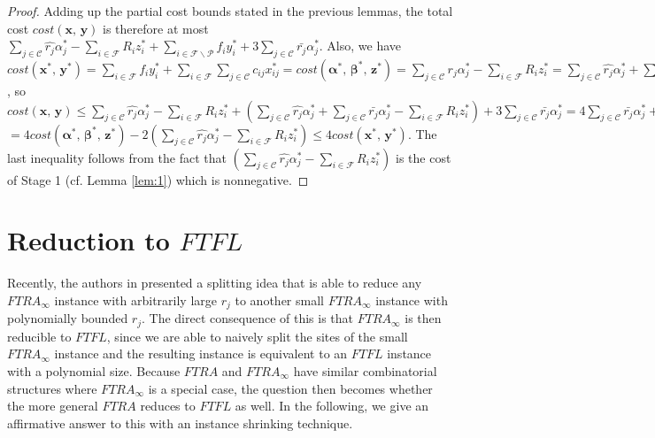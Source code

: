 \documentclass[10pt]{llncs}
\begin{document}
\begin{proof}
Adding up the partial cost bounds stated in the previous lemmas, the
total cost $cost\left(\boldsymbol{x},\,\boldsymbol{y}\right)$ is
therefore at most $\sum_{j\in\mathcal{C}}\hat{r_{j}}\alpha_{j}^{*}-\sum_{i\in\mathcal{F}}R_{i}z_{i}^{*}+\sum_{i\in\mathcal{F}\backslash\mathcal{P}}f_{i}y_{i}^{*}+3\sum_{j\in\mathcal{C}}\bar{r_{j}}\alpha_{j}^{*}$.
Also, we have $cost\left(\boldsymbol{x^{*}},\,\boldsymbol{y^{*}}\right)=\sum_{i\in\mathcal{F}}f_{i}y_{i}^{*}+\sum_{i\in\mathcal{F}}\sum_{j\in\mathcal{C}}c_{ij}x_{ij}^{*}=cost\left(\boldsymbol{\alpha^{*}},\,\boldsymbol{\beta^{*}},\,\boldsymbol{z^{*}}\right)=\sum_{j\in\mathcal{C}}r_{j}\alpha_{j}^{*}-\sum_{i\in\mathcal{F}}R_{i}z_{i}^{*}=\sum_{j\in\mathcal{C}}\hat{r_{j}}\alpha_{j}^{*}+\sum_{j\in\mathcal{C}}\bar{r_{j}}\alpha_{j}^{*}-\sum_{i\in\mathcal{F}}R_{i}z_{i}^{*}$,
so $cost\left(\boldsymbol{x},\,\boldsymbol{y}\right)\leq\sum_{j\in\mathcal{C}}\hat{r_{j}}\alpha_{j}^{*}-\sum_{i\in\mathcal{F}}R_{i}z_{i}^{*}+\left(\sum_{j\in\mathcal{C}}\hat{r_{j}}\alpha_{j}^{*}+\sum_{j\in\mathcal{C}}\bar{r_{j}}\alpha_{j}^{*}-\sum_{i\in\mathcal{F}}R_{i}z_{i}^{*}\right)+3\sum_{j\in\mathcal{C}}\bar{r_{j}}\alpha_{j}^{*}=4\sum_{j\in\mathcal{C}}\bar{r_{j}}\alpha_{j}^{*}+2\sum_{j\in\mathcal{C}}\hat{r_{j}}\alpha_{j}^{*}-2\sum_{i\in\mathcal{F}}R_{i}z_{i}^{*}$$=4cost\left(\boldsymbol{\alpha^{*}},\,\boldsymbol{\beta^{*}},\,\boldsymbol{z^{*}}\right)-2\left(\sum_{j\in\mathcal{C}}\hat{r_{j}}\alpha_{j}^{*}-\sum_{i\in\mathcal{F}}R_{i}z_{i}^{*}\right)\leq4cost\left(\boldsymbol{x^{*}},\,\boldsymbol{y^{*}}\right)$.
The last inequality follows from the fact that $\left(\sum_{j\in\mathcal{C}}\hat{r_{j}}\alpha_{j}^{*}-\sum_{i\in\mathcal{F}}R_{i}z_{i}^{*}\right)$
is the cost of Stage 1 (cf. Lemma \ref{lem:1}) which is nonnegative.
\end{proof}

\section{Reduction to $FTFL$}

Recently, the authors in \cite{yan2011newresults} presented a splitting
idea that is able to reduce any $FTRA_{\infty}$ instance with arbitrarily
large $r_{j}$ to another small $FTRA_{\infty}$ instance with polynomially
bounded $r_{j}$. The direct consequence of this is that $FTRA_{\infty}$
is then reducible to $FTFL$, since we are able to naively split the
sites of the small $FTRA_{\infty}$ instance and the resulting instance
is equivalent to an $FTFL$ instance with a polynomial size. Because
$FTRA$ and $FTRA_{\infty}$ have similar combinatorial structures
where $FTRA_{\infty}$ is a special case, the question then becomes
whether the more general $FTRA$ reduces to $FTFL$ as well. In the
following, we give an affirmative answer to this with an instance
shrinking technique.
\end{document}
